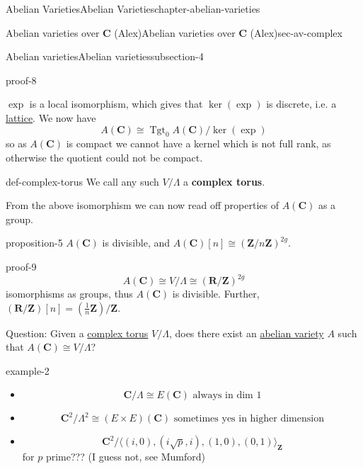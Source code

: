 \documentclass[oneside,10pt,]{book}
\newcommand{\terminology}[1]{\textbf{#1}}
\numberwithin{equation}{section}
\newcommand{\lb}{[}
\newcommand{\rb}{]}
\newcommand{\ZZ}{\mathbf{Z}}
\newcommand{\RR}{\mathbf{R}}
\newcommand{\CC}{\mathbf{C}}
\DeclareMathOperator{\Tgt}{Tgt}
\begin{document}
\begin{chapterptx}{Abelian Varieties}{}{Abelian Varieties}{}{}{chapter-abelian-varieties}
\begin{sectionptx}{Abelian varieties over \(\CC\) (Alex)}{}{Abelian varieties over \(\CC\) (Alex)}{}{}{sec-av-complex}
\begin{subsectionptx}{Abelian varieties}{}{Abelian varieties}{}{}{subsection-4}
\begin{proofptx}{}{proof-8}
\par
\hypertarget{p-45}{}%
\(\exp\) is a local isomorphism, which gives that \(\ker(\exp)\) is discrete, i.e. a \hyperref[def-buntes-lattice]{lattice}. We now have%
\begin{equation*}
A(\CC) \cong \Tgt_0A(\CC)/ \ker(\exp)
\end{equation*}
so as \(A(\CC)\) is compact we cannot have a kernel which is not full rank, as otherwise the quotient could not be compact.%
\end{proofptx}
\begin{definition}{}{def-complex-torus}%
\hypertarget{p-46}{}%
We call any such \(V/\Lambda\) a \terminology{complex torus}.%
\end{definition}
\hypertarget{p-47}{}%
From the above isomorphism we can now read off properties of \(A(\CC)\) as a group.%
\begin{proposition}{}{}{proposition-5}%
\hypertarget{p-48}{}%
\(A(\CC)\) is divisible, and \(A(\CC)\lb n\rb \cong (\ZZ/n\ZZ)^{2g}\).%
\end{proposition}
\begin{proofptx}{}{proof-9}
\hypertarget{p-49}{}%
%
\begin{equation*}
A(\CC)  \cong V/\Lambda \cong (\RR/\ZZ)^{2g}
\end{equation*}
isomorphisms as groups, thus \(A(\CC)\) is divisible. Further, \((\RR/\ZZ)\lb n \rb = (\frac 1n \ZZ)/\ZZ\).%
\end{proofptx}
\hypertarget{p-50}{}%
Question: Given a \hyperref[def-complex-torus]{complex torus} \(V/\Lambda\), does there exist an \hyperref[def-buntes-abvar]{abelian variety} \(A\) such that \(A(\CC) \cong V/\Lambda\)?%
\begin{example}{}{example-2}%
\hypertarget{p-51}{}%
\leavevmode%
\begin{itemize}[label=\textbullet]
\item{}%
\begin{equation*}
\CC/\Lambda \cong E(\CC) \text{ always in dim 1}
\end{equation*}
%
\item{}%
\begin{equation*}
\CC^2/\Lambda^2 \cong (E\times E)(\CC) \text{ sometimes yes in higher dimension}
\end{equation*}
%
\item{}%
\begin{equation*}
\CC^2/\langle (i, 0), (i\sqrt p, i), (1, 0), (0, 1)\rangle_\ZZ
\end{equation*}
for \(p\) prime??? (I guess not, see Mumford)%

\end{itemize}
\end{example}
\end{subsectionptx}
\end{sectionptx}
\end{chapterptx}
\end{document}
